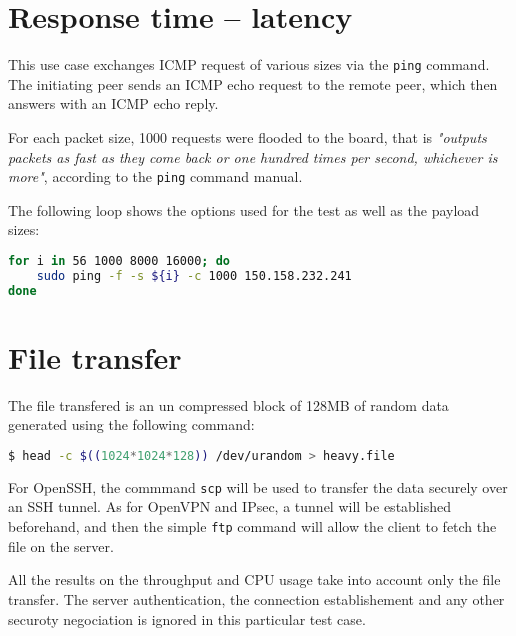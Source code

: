 \section{Response time -- latency}
This use case exchanges ICMP request of various sizes via the \texttt{ping} command.
The initiating peer sends an ICMP echo request to the remote peer, which then answers with an ICMP echo reply.

\noindent For each packet size, 1000 requests were flooded to the board, that is \textit{"outputs packets as fast as they come back or one hundred times per second, whichever is more"}, according to the \texttt{ping} command manual.

The following loop shows the options used for the test as well as the payload sizes:
\begin{lstlisting}[language=bash]
for i in 56 1000 8000 16000; do
	sudo ping -f -s ${i} -c 1000 150.158.232.241
done
\end{lstlisting}

\section{File transfer}
The file transfered is an un compressed block of 128MB of random data generated using the following command:
\begin{lstlisting}[language=bash]
  $ head -c $((1024*1024*128)) /dev/urandom > heavy.file
\end{lstlisting}

For OpenSSH, the commmand \texttt{scp} will be used to transfer the data securely over an SSH tunnel.
As for OpenVPN and IPsec, a tunnel will be established beforehand, and then the simple \texttt{ftp} command will allow the client to fetch the file on the server.

All the results on the throughput and CPU usage take into account only the file transfer.
The server authentication, the connection establishement and any other securoty negociation is ignored in this particular test case.
